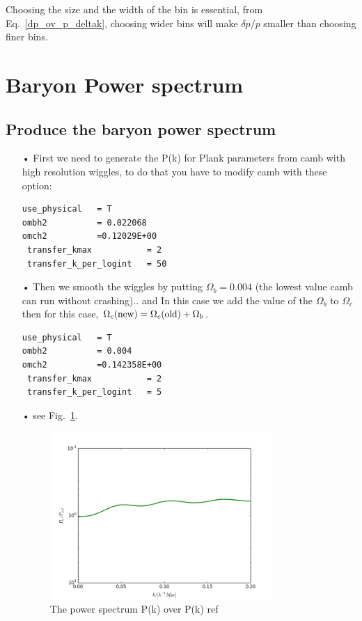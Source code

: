 \documentclass[10pt,a4paper]{article}
\begin{document}
Choosing the size and the width of the bin is essential, from Eq.~\ref{dp_ov_p_deltak}, choosing wider bins will make $\delta p/p$ smaller than choosing finer bins.

\section{Baryon Power spectrum}

\subsection{Produce the baryon power spectrum}
\begin{itemize}


\item[•] First we need to generate the P(k) for Plank parameters from camb with high resolution wiggles, to do that you have to modify camb with these option:
\begin{verbatim}
use_physical   = T
ombh2          = 0.022068
omch2          =0.12029E+00
 transfer_kmax           = 2
 transfer_k_per_logint   = 50 
\end{verbatim}
\item[•] Then we smooth the wiggles by putting $\Omega_b = 0.004$ (the lowest value camb can run without crashing).. and 
In this case we add the value of the  $\Omega_b$ to $\Omega_c$ then for this case, $\Omega_c({\rm new})= \Omega_c({\rm old}) + \Omega_b$.
\begin{verbatim}
use_physical   = T
ombh2          = 0.004
omch2          =0.142358E+00
 transfer_kmax           = 2
 transfer_k_per_logint   = 5
\end{verbatim}
\item[•] see Fig.~\ref{fig:pk_ov_pkref}.
\begin{figure}
\includegraphics[width=0.8\textwidth]{Pb_vs_Pnobaryons_test.png}
\caption{The power spectrum P(k) over P(k) ref}
\label{fig:pk_ov_pkref}
\end{figure}
\end{itemize}
\end{document}
